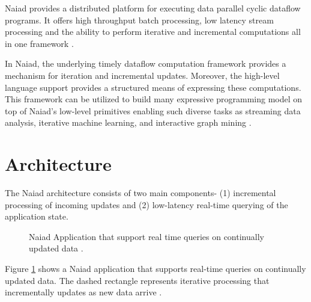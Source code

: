 \documentclass[9pt,twocolumn,twoside]{../../styles/osajnl}
\begin{document}
Naiad provides a distributed platform for executing data parallel
cyclic dataflow programs. It offers high throughput batch processing,
low latency stream processing and the ability to perform iterative and
incremental computations all in one framework
\cite{www-blog-huula-review-naiad}.

In Naiad, the underlying timely dataflow computation framework
provides a mechanism for iteration and incremental updates. Moreover,
the high-level language support provides a structured means of
expressing these computations. This framework can be utilized to build
many expressive programming model on top of Naiad’s low-level
primitives enabling such diverse tasks as streaming data analysis,
iterative machine learning, and interactive graph mining
\cite{paper2-Naiad}.


\section{Architecture}

The Naiad architecture consists of two main components- (1)
incremental processing of incoming updates and (2) low-latency
real-time querying of the application state.
\begin{figure}[htbp]
\centering
{}
\caption{Naiad Application that support real time queries on
  continually updated data \cite{paper1-Naiad}.}
\label{Naiad-arch}
\end{figure}

Figure \ref{Naiad-arch} shows a Naiad application that supports
real-time queries on continually updated data. The dashed rectangle
represents iterative processing that incrementally updates as new data
arrive \cite{paper1-Naiad}.
\end{document}
